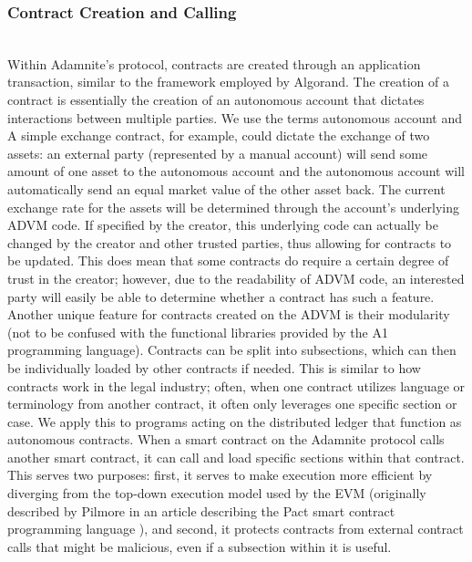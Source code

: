 \documentclass[conference]{IEEEtran}
\begin{document}
\subsubsection{Contract Creation and Calling}\\
Within Adamnite's protocol, contracts are created through an application transaction, similar to the framework employed by Algorand. The creation of a contract is essentially the creation of an autonomous account that dictates interactions between multiple parties. We use the terms autonomous account and  A simple exchange contract, for example, could dictate the exchange of two assets: an external party (represented by a manual account) will send some amount of one asset to the autonomous account and the autonomous account will automatically send an equal market value of the other asset back. The current exchange rate for the assets will be determined through the account's underlying ADVM code. If specified by the creator, this underlying code can actually be changed by the creator and other trusted parties, thus allowing for contracts to be updated. This does mean that some contracts do require a certain degree of trust in the creator; however, due to the readability of ADVM code, an interested party will easily be able to determine whether a contract has such a feature.\\

Another unique feature for contracts created on the ADVM is their modularity (not to be confused with the functional libraries provided by the A1 programming language). Contracts can be split into subsections, which can then be individually loaded by other contracts if needed. This is similar to how contracts work in the legal industry; often, when one contract utilizes language or terminology from another contract, it often only leverages one specific section or case. We apply this to programs acting on the distributed ledger that function as autonomous contracts. When a smart contract on the Adamnite protocol calls another smart contract, it can call and load specific sections within that contract. This serves two purposes: first, it serves to make execution more efficient by diverging from the  top-down execution model used by the EVM (originally described by Pilmore in an article describing the Pact smart contract programming language \cite{pilmore2019EVM}), and second, it protects contracts from external contract calls that might be malicious, even if a subsection within it is useful. 
\end{document}
